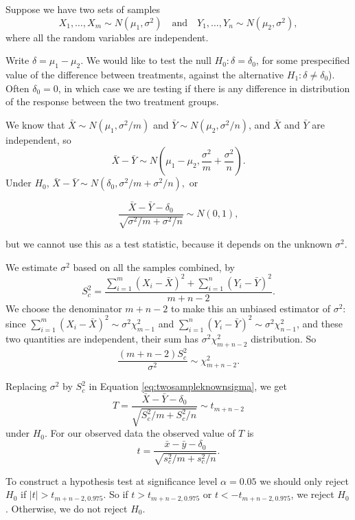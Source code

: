 \documentclass[]{book}
\theoremstyle{definition}
\theoremstyle{definition}
\theoremstyle{definition}
\theoremstyle{remark}
\let\BeginKnitrBlock\begin \let\EndKnitrBlock\end
\begin{document}
\BeginKnitrBlock{example}[Classical two-sample $t$-test]
\protect\hypertarget{exm:twosamplet}{}{\label{exm:twosamplet}
\iffalse (Classical two-sample \(t\)-test) \fi{} }Suppose we have two
sets of samples
\[X_1, \ldots, X_{m} \sim N(\mu_1, \sigma^2) \quad \text{and} \quad
Y_1, \ldots, Y_{n} \sim N(\mu_2, \sigma^2),\] where all the random
variables are independent.

Write \(\delta = \mu_1 - \mu_2\). We would like to test the null
\(H_0: \delta = \delta_0\), for some prespecified value of the
difference between treatments, against the alternative
\(H_1: \delta \not = \delta_0\)). Often \(\delta_0 = 0\), in which case
we are testing if there is any difference in distribution of the
response between the two treatment groups.

We know that \(\bar X \sim N(\mu_1, \sigma^2/m)\) and
\(\bar Y \sim N(\mu_2, \sigma^2/n)\), and \(\bar X\) and \(\bar Y\) are
independent, so \[\bar X - \bar Y \sim N\left(\mu_1 - \mu_2, 
\frac{\sigma^2}{m}+ \frac{\sigma^2}{n}\right).\] Under \(H_0\),
\(\bar X - \bar Y \sim N(\delta_0, \sigma^2/m+ \sigma^2/n),\) or

\begin{equation}
\frac{\bar X - \bar Y - \delta_0}{\sqrt{\sigma^2/m+ \sigma^2/n}}
\sim N(0, 1),
\label{eq:twosampleknownsigma}
\end{equation}

but we cannot use this as a test statistic, because it depends on the
unknown \(\sigma^2\).

We estimate \(\sigma^2\) based on all the samples combined, by
\[S_c^2 = \frac{\sum_{i=1}^{m} (X_i - \bar X)^2 + 
\sum_{i=1}^{n}(Y_i - \bar Y)^2}{m + n - 2}.\] We choose the denominator
\(m + n - 2\) to make this an unbiased estimator of \(\sigma^2\): since
\(\sum_{i=1}^{m} (X_i - \bar X)^2 \sim \sigma^2 \chi^2_{m - 1}\) and
\(\sum_{i=1}^{n} (Y_i - \bar Y)^2 \sim \sigma^2 \chi^2_{n - 1}\), and
these two quantities are independent, their sum has
\(\sigma^2 \chi^2_{m + n - 2}\) distribution. So
\[\frac{(m + n - 2)S_c^2}{\sigma^2} \sim \chi^2_{m + n - 2}.\]

Replacing \(\sigma^2\) by \(S_c^2\) in Equation
\eqref{eq:twosampleknownsigma}, we get
\[T = \frac{\bar X - \bar Y - \delta_0}{\sqrt{S_c^2 / m+ S_c^2 / n}}
\sim t_{m + n - 2}\] under \(H_0\). For our observed data the observed
value of \(T\) is
\[t = \frac{\bar x - \bar y - \delta_0}{\sqrt{s_c^2 / m+ s_c^2 / n}}.\]

To construct a hypothesis test at significance level \(\alpha = 0.05\)
we should only reject \(H_0\) if \(|t| > t_{m+n-2, 0.975}\). So if
\(t > t_{m+n-2, 0.975}\) or \(t < -t_{m+n-2, 0.975}\), we reject
\(H_0\). Otherwise, we do not reject \(H_0\).
\EndKnitrBlock{example}
\end{document}
